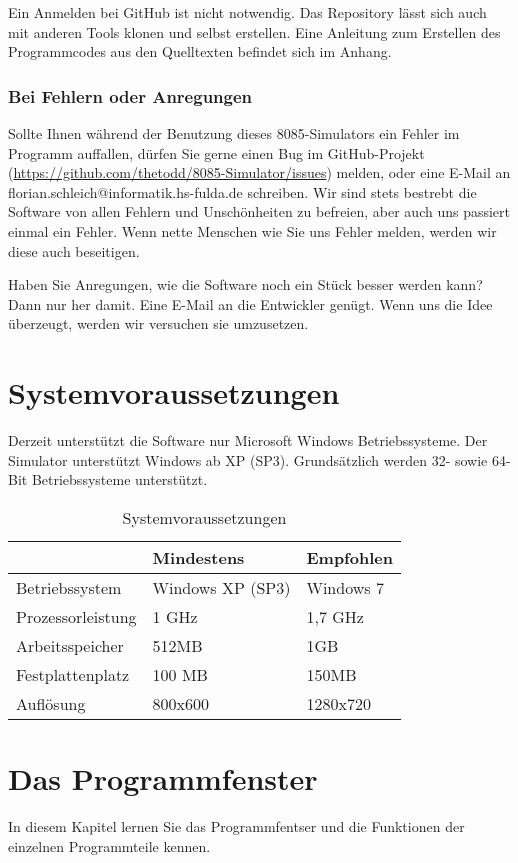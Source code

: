 \documentclass[11pt,a4paper]{hsfuldabook}
\begin{document}
Ein Anmelden bei GitHub ist nicht notwendig. Das Repository lässt sich auch mit anderen Tools
klonen und selbst erstellen. Eine Anleitung zum Erstellen des Programmcodes aus den Quelltexten befindet
sich im Anhang.

\subsection{Bei Fehlern oder Anregungen}
Sollte Ihnen während der Benutzung dieses 8085-Simulators ein Fehler im Programm auffallen, dürfen
Sie gerne einen Bug im GitHub-Projekt (\url{https://github.com/thetodd/8085-Simulator/issues}) melden,
oder eine E-Mail an florian.schleich@informatik.hs-fulda.de schreiben. Wir sind stets bestrebt die
Software von allen Fehlern und Unschönheiten zu befreien, aber auch uns passiert einmal ein Fehler.
Wenn nette Menschen wie Sie uns Fehler melden, werden wir diese auch beseitigen.

Haben Sie Anregungen, wie die Software noch ein Stück besser werden kann? Dann nur her damit. Eine
E-Mail an die Entwickler genügt. Wenn uns die Idee überzeugt, werden wir versuchen sie umzusetzen.

\chapter{Systemvoraussetzungen}
Derzeit unterstützt die Software nur Microsoft Windows Betriebssysteme. Der Simulator unterstützt
Windows ab XP (SP3). Grundsätzlich werden 32- sowie 64-Bit Betriebssysteme unterstützt.
\begin{table}[h!]
	\begin{tabular}{l || l | l}
	 & Mindestens & Empfohlen \\
	 \hline
	 Betriebssystem & Windows XP (SP3) & Windows 7\\
	 Prozessorleistung & 1 GHz & 1,7 GHz \\
	 Arbeitsspeicher & 512MB & 1GB \\
	 Festplattenplatz & 100 MB & 150MB \\
	 Auflösung & 800x600 & 1280x720 \\
	\end{tabular}
	\caption{Systemvoraussetzungen}
\end{table}

\chapter{Das Programmfenster}
In diesem Kapitel lernen Sie das Programmfentser und die Funktionen der einzelnen Programmteile kennen.
\end{document}
